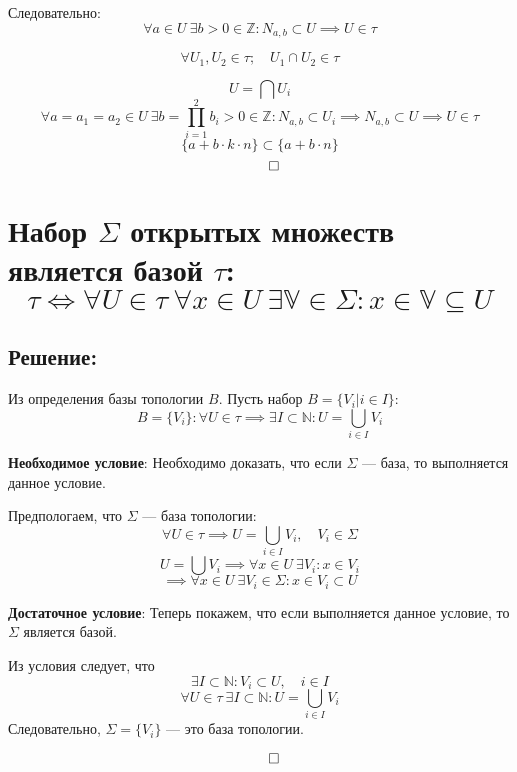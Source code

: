 \documentclass{article}
\begin{document}
        Следовательно:
        \[
        \forall a \in U \ \exists b > 0 \in \mathbb{Z}  : N_{a,b} \subset U \implies U \in \tau
        \]
        
        \[
        \forall U_1, U_2 \in \tau; \quad U_1 \cap U_2 \in \tau
        \]
        
        \[
        U = \bigcap U_i
        \]
        \[
        \forall a = a_1 = a_2 \in U \ \exists b = \prod_{i=1}^{2} b_i > 0 \in \mathbb{Z}  : N_{a,b} \subset U_i \implies N_{a,b} \subset U \implies U \in \tau
        \]
        \[
        \{a + b \cdot k \cdot n \} \subset \{a + b \cdot n \}
        \]
        \[
        \qed 
        \]

        \section{Набор $\Sigma$ открытых множеств является базой  $\tau$:
            \[
            \tau \iff \forall U \in \tau \ \forall x \in U \ \exists \mathbb{V} \in \Sigma : x \in \mathbb{V} \subseteq  U
            \]} 
        
        \subsection{Решение:}
        Из определения базы топологии $B$. Пусть набор $B = \{V_i | i \in I \}$:
        \[
        B = \{V_i\} : \forall U \in \tau \implies \exists I \subset \mathbb{N} : U = \bigcup_{i \in I} V_i
        \]
        
        \textbf{Необходимое условие}:
        Необходимо доказать, что если $\Sigma$ — база, то выполняется данное условие.
        
        Предпологаем, что $\Sigma$ — база топологии:
        \[
        \forall U \in \tau \implies U = \bigcup_{i \in I} V_i, \quad V_i \in \Sigma
        \]
        \[
        U = \bigcup V_i \implies \forall x \in U \ \exists V_i : x \in V_i
        \]
        \[
        \implies \forall x \in U \ \exists V_i \in \Sigma : x \in V_i  \subset U
        \]
        
        \textbf{Достаточное условие}:
        Теперь покажем, что если выполняется данное условие, то $\Sigma$ является базой.
        
        Из условия следует, что
        \[
        \exists I \subset \mathbb{N} : V_i \subset U, \quad i \in I
        \]
        \[
        \forall U \in \tau \ \exists I \subset \mathbb{N} : U = \bigcup_{i \in I} V_i
        \]
        Следовательно, $\Sigma = \{V_i\}$ — это база топологии.
        
        \[
        \qed 
        \]
               
        
\end{document}
